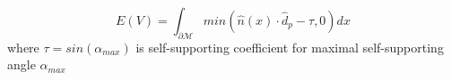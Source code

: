 \documentclass[11pt]{article}
\begin{document}
\[
    E(V) = \int_{\partial \mathcal{M}} min(\hat{n}(x) \cdot \hat{d}_p - \tau, 0) dx
\]
where $\tau = sin(\alpha_{max})$ is self-supporting coefficient for maximal self-supporting angle $\alpha_{max}$
\end{document}
